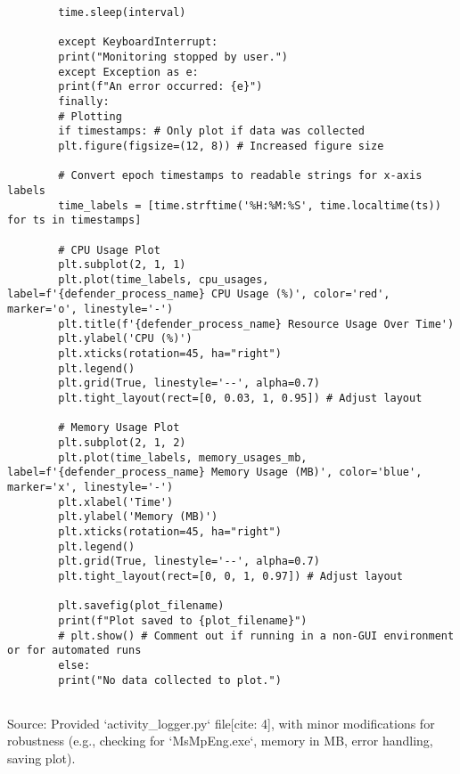 \documentclass[11pt]{article}
\begin{document}
\begin{lstlisting}
		time.sleep(interval)
		
		except KeyboardInterrupt:
		print("Monitoring stopped by user.")
		except Exception as e:
		print(f"An error occurred: {e}")
		finally:
		# Plotting
		if timestamps: # Only plot if data was collected
		plt.figure(figsize=(12, 8)) # Increased figure size
		
		# Convert epoch timestamps to readable strings for x-axis labels
		time_labels = [time.strftime('%H:%M:%S', time.localtime(ts)) for ts in timestamps]
		
		# CPU Usage Plot
		plt.subplot(2, 1, 1)
		plt.plot(time_labels, cpu_usages, label=f'{defender_process_name} CPU Usage (%)', color='red', marker='o', linestyle='-')
		plt.title(f'{defender_process_name} Resource Usage Over Time')
		plt.ylabel('CPU (%)')
		plt.xticks(rotation=45, ha="right")
		plt.legend()
		plt.grid(True, linestyle='--', alpha=0.7)
		plt.tight_layout(rect=[0, 0.03, 1, 0.95]) # Adjust layout
		
		# Memory Usage Plot
		plt.subplot(2, 1, 2)
		plt.plot(time_labels, memory_usages_mb, label=f'{defender_process_name} Memory Usage (MB)', color='blue', marker='x', linestyle='-')
		plt.xlabel('Time')
		plt.ylabel('Memory (MB)')
		plt.xticks(rotation=45, ha="right")
		plt.legend()
		plt.grid(True, linestyle='--', alpha=0.7)
		plt.tight_layout(rect=[0, 0, 1, 0.97]) # Adjust layout
		
		plt.savefig(plot_filename)
		print(f"Plot saved to {plot_filename}")
		# plt.show() # Comment out if running in a non-GUI environment or for automated runs
		else:
		print("No data collected to plot.")
		
	\end{lstlisting}
	Source: Provided `activity_logger.py` file[cite: 4], with minor modifications for robustness (e.g., checking for `MsMpEng.exe`, memory in MB, error handling, saving plot).
	
	
\end{document}
